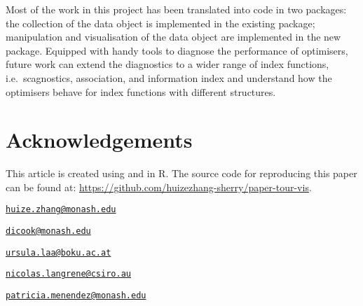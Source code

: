 Most of the work in this project has been translated into code in two
packages: the collection of the data object is implemented in the
existing \citep{tourr} package; manipulation and
visualisation of the data object are implemented in the new 
package. Equipped with handy tools to diagnose the performance of
optimisers, future work can extend the diagnostics to a wider range of
index functions, i.e.~scagnostics, association, and information index
\citep{laa2020using} and understand how the optimisers behave for index
functions with different structures.

\hypertarget{acknowledgements}{%
\section{Acknowledgements}\label{acknowledgements}}

This article is created using \citep{knitr} and
 \citep{rmarkdown} in R. The source code for
reproducing this paper can be found at:
\url{https://github.com/huizezhang-sherry/paper-tour-vis}.




\address{%
H.Sherry Zhang\\
Monash University\\
Department of Econometrics and Business Statistics\\
}
\href{mailto:huize.zhang@monash.edu}{\nolinkurl{huize.zhang@monash.edu}}

\address{%
Dianne Cook\\
Monash University\\
Department of Econometrics and Business Statistics\\
}
\href{mailto:dicook@monash.edu}{\nolinkurl{dicook@monash.edu}}

\address{%
Ursula Laa\\
University of Natural Resources and Life Sciences\\
Institute of Statistics\\
}
\href{mailto:ursula.laa@boku.ac.at}{\nolinkurl{ursula.laa@boku.ac.at}}

\address{%
Nicolas Langrené\\
CSIRO Data61\\
34 Village Street, Docklands VIC 3008 Australia\\
}
\href{mailto:nicolas.langrene@csiro.au}{\nolinkurl{nicolas.langrene@csiro.au}}

\address{%
Patricia Menéndez\\
Monash University\\
Department of Econometrics and Business Statistics\\
}
\href{mailto:patricia.menendez@monash.edu}{\nolinkurl{patricia.menendez@monash.edu}}

